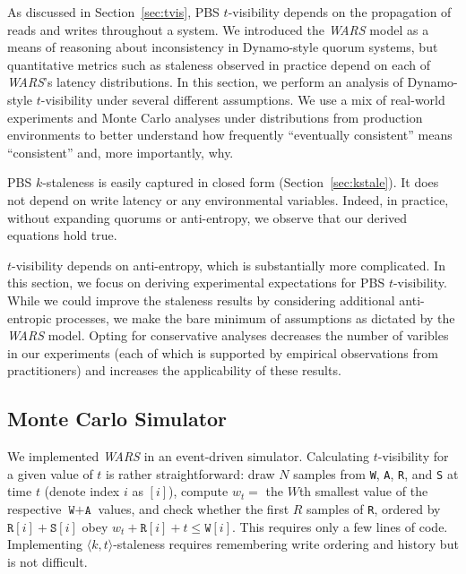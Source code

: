 \documentclass{vldb}
\newcommand{\subsectionskip}{-0em}
\begin{document}
As discussed in Section~\ref{sec:tvis}, PBS $t$-visibility depends on
the propagation of reads and writes throughout a system.  We
introduced the \textit{WARS}  model as a means of reasoning about
inconsistency in Dynamo-style quorum systems, but quantitative metrics
such as staleness observed in practice depend on each of \textit{WARS}'s
latency distributions.  In this section, we perform an analysis of
Dynamo-style $t$-visibility under several different assumptions.  We
use a mix of real-world experiments and Monte Carlo analyses
under distributions from production environments to better
understand how frequently ``eventually consistent'' means
``consistent'' and, more importantly, why.

PBS $k$-staleness is easily captured in closed form
(Section~\ref{sec:kstale}).  It does not depend on write latency or
any environmental variables.  Indeed, in practice, without expanding
quorums or anti-entropy, we observe that our derived equations hold
true.

$t$-visibility depends on anti-entropy, which is substantially more
complicated.  In this section, we focus on deriving experimental
expectations for PBS $t$-visibility.  While we could improve the
staleness results by considering additional anti-entropic processes,
we make the bare minimum of assumptions as dictated by the
\textit{WARS} model.  Opting for conservative analyses decreases the
number of varibles in our experiments (each of which is supported by
empirical observations from practitioners) and increases the
applicability of these results.

\vspace{\subsectionskip}\subsection{Monte Carlo Simulator}
\label{sec:mcsim}

We implemented \textit{WARS} in an event-driven simulator.
Calculating $t$-visibility for a given value of $t$ is rather
straightforward: draw $N$ samples from \texttt{W}, \texttt{A},
\texttt{R}, and \texttt{S} at time $t$ (denote index $i$ as $[i]$),
compute $w_t = $ the $W$th smallest value of the respective
$\texttt{W}+\texttt{A}$ values, and check whether the first $R$
samples of \texttt{R}, ordered by $\texttt{R}[i]+\texttt{S}[i]$ obey
$w_t+\texttt{R}[i] + t\leq \texttt{W}[i]$.  This requires only a few
lines of code.  Implementing $\langle k, t \rangle$-staleness requires
remembering write ordering and history but is not difficult.
\end{document}
